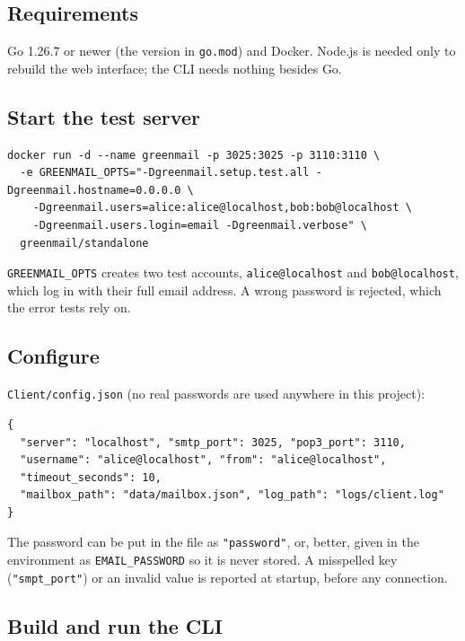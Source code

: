 \documentclass[11pt,a4paper]{article}
\begin{document}
\subsection{Requirements}

Go 1.26.7 or newer (the version in \texttt{go.mod}) and Docker. Node.js is needed only to rebuild the
web interface; the CLI needs nothing besides Go.

\subsection{Start the test server}

\begin{lstlisting}[style=wire]
docker run -d --name greenmail -p 3025:3025 -p 3110:3110 \
  -e GREENMAIL_OPTS="-Dgreenmail.setup.test.all -Dgreenmail.hostname=0.0.0.0 \
    -Dgreenmail.users=alice:alice@localhost,bob:bob@localhost \
    -Dgreenmail.users.login=email -Dgreenmail.verbose" \
  greenmail/standalone
\end{lstlisting}

\texttt{GREENMAIL\_OPTS} creates two test accounts, \texttt{alice@localhost} and
\texttt{bob@localhost}, which log in with their full email address. A wrong password is rejected, which the error tests rely on.

\subsection{Configure}

\texttt{Client/config.json} (no real passwords are used anywhere in this project):

\begin{lstlisting}[style=wire]
{
  "server": "localhost", "smtp_port": 3025, "pop3_port": 3110,
  "username": "alice@localhost", "from": "alice@localhost",
  "timeout_seconds": 10,
  "mailbox_path": "data/mailbox.json", "log_path": "logs/client.log"
}
\end{lstlisting}

The password can be put in the file as \texttt{"password"}, or, better, given in the
environment as \texttt{EMAIL\_PASSWORD} so it is never stored. A misspelled key
(\texttt{"smpt\_port"}) or an invalid value is reported at startup, before any connection.

\subsection{Build and run the CLI}
\end{document}
